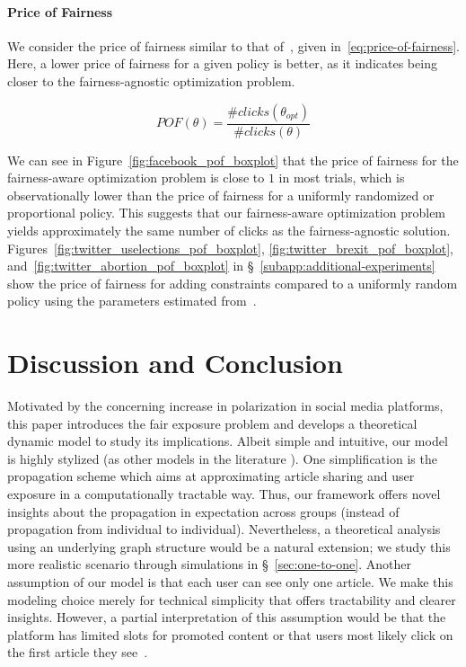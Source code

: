 \documentclass[letterpaper]{article} %
\begin{document}
\paragraph{Price of Fairness}
We consider the price of fairness similar to that of~\citet{bertsimas2011price}, given in~\eqref{eq:price-of-fairness}.
Here, a lower price of fairness for a given policy is better, as it indicates being closer to the fairness-agnostic optimization problem.

\footnotesize
\begin{equation}\label{eq:price-of-fairness}
    POF(\theta) = \frac{\# clicks(\theta_{opt})}{\# clicks(\theta)}
\end{equation}
\normalsize

We can see in Figure~\ref{fig:facebook_pof_boxplot} that the price of fairness for the fairness-aware optimization problem is close to $1$ in most trials, which is observationally lower than the price of fairness for a uniformly randomized or proportional policy.
This suggests that our fairness-aware optimization problem yields approximately the same number of clicks as the fairness-agnostic solution.
Figures~\ref{fig:twitter_uselections_pof_boxplot}, \ref{fig:twitter_brexit_pof_boxplot}, and~\ref{fig:twitter_abortion_pof_boxplot} in \S~\ref{subapp:additional-experiments} show the price of fairness for adding constraints compared to a uniformly random policy using the parameters estimated from~\citet{balancedExposure}.


\section{Discussion and Conclusion}\label{sec:discussion_and_limitations}

Motivated by the concerning increase in polarization in social media platforms, this paper introduces the fair exposure problem and develops a theoretical dynamic model to study its implications.
Albeit simple and intuitive, our model is highly stylized (as other models in the literature \citep{papanastasiou2020fake, allon2019information}).
One simplification is the propagation scheme which aims at approximating article sharing and user exposure in a computationally tractable way.
Thus, our framework offers novel insights about the propagation in expectation across groups (instead of propagation from individual to individual).
Nevertheless, a theoretical analysis using an underlying graph structure would be a natural extension; we study this more realistic scenario through simulations in \S~\ref{sec:one-to-one}.
Another assumption of our model is that each user can see only one article.
We make this modeling choice merely for technical simplicity that offers tractability and clearer insights.
However, a partial interpretation of this assumption would be that the platform has limited slots for promoted content or that users most likely click on the first article they see~\citep{robertson1978ranking,wang2013incorporating,craswell2008experimental}.
\end{document}
